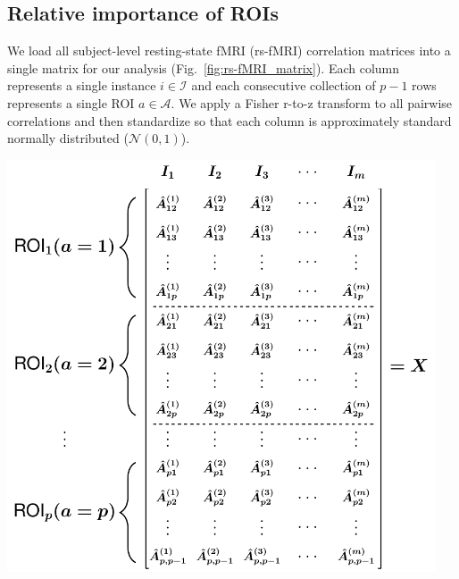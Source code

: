 \documentclass[10pt,letterpaper]{article}\usepackage[]{graphicx}\usepackage[]{color}
\begin{document}
\vspace{0.25cm}

\subsection{Relative importance of ROIs}

We load all subject-level resting-state fMRI (rs-fMRI) correlation matrices into a single matrix for our analysis (Fig.~\ref{fig:rs-fMRI_matrix}). Each column represents a single instance $i \in \mathcal{I}$ and each consecutive collection of $p-1$ rows represents a single ROI $a \in \mathcal{A}$. We apply a Fisher r-to-z transform to all pairwise correlations and then standardize so that each column is approximately standard normally distributed ($\mathcal{N}(0,1)$).

\bigskip

\begin{minipage}[c]{0.7\textwidth}\hspace{-0.6cm}
	\includegraphics[width=0.95\textwidth]{fig5_rs_fmri_all_instance_matrix.pdf}
\end{minipage}\hspace{-0.8cm}
\begin{minipage}[c]{0.3\textwidth}
	\captionsetup{type=figure}\label{fig:rs-fMRI_matrix}
\end{minipage}
\end{document}

